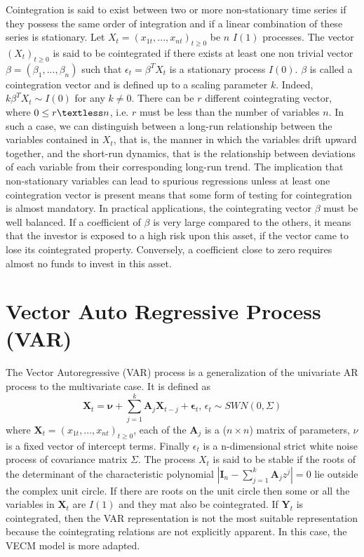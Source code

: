 \documentclass[11pt,a4,twosided,singlespacing,titlepagenumber=on]{scrreprt}
\numberwithin{equation}{chapter} %
\theoremstyle{remark}
\newcommand{\matr}[1]{\mathbf{#1}}
\begin{document}
Cointegration is said to exist between two or more non-stationary time series if they possess the same order of integration and if a linear combination of these series is stationary. Let $X_t = (x_{1t},...,x_{nt})_{t \geq 0}$ be $n$ $I(1)$ processes. The vector $(X_t)_{t \geq 0}$ is said to be cointegrated if there exists at least one non trivial vector $\beta = (\beta_1,...,\beta_n)$ such that $\epsilon_t = \beta^T X_t$ is a stationary process $I(0)$. $\beta$ is called a cointegration vector and is defined up to a scaling parameter $k$. Indeed, $k\beta^TX_t \sim I(0)$ for any $k \neq 0$. There can be $r$ different cointegrating vector, where $0 \leq r \textless n$, i.e. $r$ must be less than the number of variables $n$. In such a case, we can distinguish between a long-run relationship between the variables contained in $X_t$, that is, the manner in which the variables drift upward together, and the short-run dynamics, that is the relationship between deviations of each variable from their corresponding long-run trend. The implication that non-stationary variables can lead to spurious regressions unless at least one cointegration vector is present means that some form of testing for cointegration is almost mandatory. In practical applications, the cointegrating vector $\beta$ must be well balanced. If a coefficient of $\beta$ is very large compared to the others, it means that the investor is exposed to a high risk upon this asset, if the vector came to lose its cointegrated property. Conversely, a coefficient close to zero requires almost no funds to invest in this asset.

\section{Vector Auto Regressive Process (VAR)}
The Vector Autoregressive (VAR) process is a generalization of the univariate AR process to the multivariate case. It is defined as
\begin{equation}
\matr{X}_t = \matr{\nu} + \sum_{j=1}^k \matr{A}_j \matr{X}_{t-j} + \matr{\epsilon}_t \text{, } \epsilon_t \sim SWN(0, \Sigma)
\end{equation}
where $\matr{X}_t = (x_{1t},...,x_{nt})_{t \geq 0}$, each of the $\matr{A}_j$ is a ($n \times n$) matrix of parameters, $\nu$ is a fixed vector of intercept terms. Finally $\epsilon_t$ is a n-dimensional strict white noise process of covariance matrix $\Sigma$. The process $X_t$ is said to be stable if the roots of the determinant of the characteristic polynomial $|\matr{I}_n - \sum_{j=1}^k \matr{A}_j z^j| = 0$ lie outside the complex unit circle. If there are roots on the unit circle then some or all the variables in $\matr{X}_t$ are $I(1)$ and they mat also be cointegrated. If $\matr{Y}_t$ is cointegrated, then the VAR representation is not the most suitable representation because the cointegrating relations are not explicitly apparent. In this case, the VECM model is more adapted.
\end{document}

